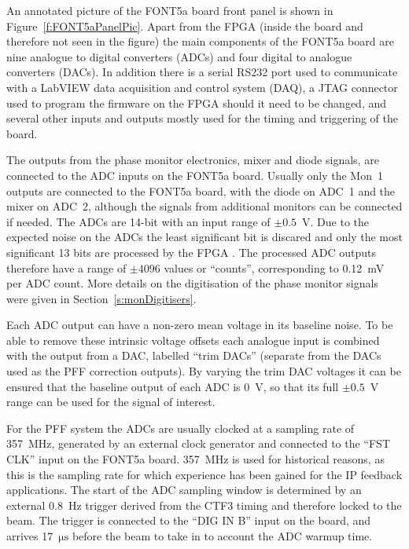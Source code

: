 An annotated picture of the FONT5a board front panel is shown in Figure~\ref{f:FONT5aPanelPic}. Apart from the FPGA (inside the board and therefore not seen in the figure) the main components of the FONT5a board are nine analogue to digital converters (ADCs) and four digital to analogue converters (DACs). In addition there is a serial RS232 port used to communicate with a LabVIEW data acquisition and control system (DAQ), a JTAG connector used to program the firmware on the FPGA should it need to be changed, and several other inputs and outputs mostly used for the timing and triggering of the board.

The outputs from the phase monitor electronics, mixer and diode signals, are connected to the ADC inputs on the FONT5a board. Usually only the Mon~1 outputs are connected to the FONT5a board, with the diode on ADC~1 and the mixer on ADC~2, although the signals from additional monitors can be connected if needed. The ADCs are 14-bit with an input range of \(\pm0.5\)~V. Due to the expected noise on the ADCs the least significant bit is discared and only the most significant 13 bits are processed by the FPGA \cite{fontPaper}. The processed ADC outputs therefore have a range of \(\pm4096\) values or ``counts'', corresponding to 0.12~mV per ADC count. More details on the digitisation of the phase monitor signals were given in Section~\ref{s:monDigitisers}. 

Each ADC output can have a non-zero mean voltage in its baseline noise. To be able to remove these intrinsic voltage offsets each analogue input is combined with the output from a DAC, labelled ``trim DACs'' (separate from the DACs used as the PFF correction outputs). By varying the trim DAC voltages it can be ensured that the baseline output of each ADC is 0~V, so that its full \(\pm0.5\)~V range can be used for the signal of interest.

For the PFF system the ADCs are usually clocked at a sampling rate of 357~MHz, generated by an external clock generator \cite{srsClockGen} and connected to the ``FST CLK'' input on the FONT5a board. 357~MHz is used for historical reasons, as this is the sampling rate for which experience has been gained for the IP feedback applications. The start of the ADC sampling window is determined by an external 0.8~Hz trigger derived from the CTF3 timing and therefore locked to the beam. The trigger is connected to the ``DIG IN B'' input on the board, and arrives 17~\(\mathrm{\mu s}\) before the beam to take in to account the ADC warmup time.

